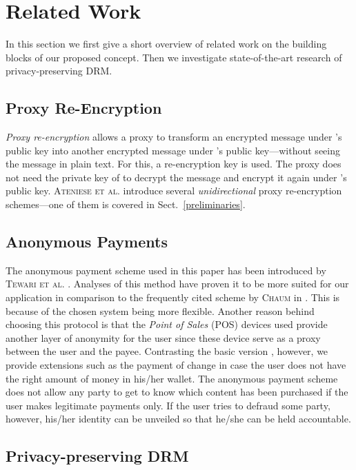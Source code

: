 \documentclass{llncs}
\newcommand{\refSec}[1]{Sect.~\ref{#1}}
\begin{document}
\section{Related Work} \label{related_work}

In this section we first give a short overview of related work on the building blocks of our proposed concept. Then we investigate state-of-the-art research of privacy-preserving DRM. 

\subsection{Proxy Re-Encryption}

\emph{Proxy re-encryption} allows a proxy to transform an encrypted message under 's public key into another encrypted message under 's public key---without seeing the message in plain text. For this, a re-encryption key  is used. The proxy does not need the private key of  to decrypt the message and encrypt it again under 's public key. \textsc{Ateniese et al.} \cite{ateniese_improved} introduce several \emph{unidirectional} proxy re-encryption schemes---one of them is covered in \refSec{preliminaries}. 


\subsection{Anonymous Payments} \label{payment}

The anonymous payment scheme used in this paper has been introduced by \textsc{Tewari et al.} \cite{Tewari1998}. Analyses of this method have proven it to be more suited for our application in comparison to the frequently cited scheme by \textsc{Chaum} \cite{chaum_cash} in \cite{architecture}. This is because of the chosen system being more flexible. Another reason behind choosing this protocol is that the \emph{Point of Sales} (POS) devices used provide another layer of anonymity for the user since these device serve as a proxy between the user and the payee. Contrasting the basic version \cite{Tewari1998}, however, we provide extensions such as the payment of change in case the user does not have the right amount of money in his/her wallet. The anonymous payment scheme does not allow any party to get to know which content has been purchased if the user makes legitimate payments only. If the user tries to defraud some party, however, his/her identity can be unveiled so that he/she can be held accountable.


\subsection{Privacy-preserving DRM}
\end{document}

